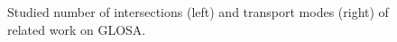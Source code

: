 \begin{figure}[t]
\centering
{}
\caption{Studied number of intersections (left) and transport modes (right) of related work on GLOSA.}
\label{fig:related-work-additional-piecharts}
\end{figure}

